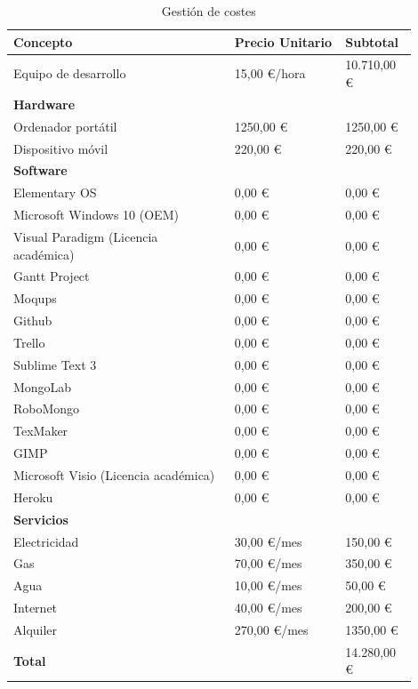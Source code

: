 	\begin{table}[H]
	  \centering 
	  \begin{tabular}{p{0.5\linewidth}p{0.25\linewidth}p{0.15\linewidth}}
	  	\multicolumn{1}{l}{\cellcolor{black!30}\textbf{Concepto}} &
	    \multicolumn{1}{l}{\cellcolor{black!30}\textbf{Precio Unitario}} & 
	 	\multicolumn{1}{l}{\cellcolor{black!30}\textbf{Subtotal}}
	 	\\	 
	    \toprule
		Equipo de desarrollo 					&	15,00 \euro /hora	&	10.710,00 \euro	\\
		
		\multicolumn{3}{l}{\cellcolor{black!30}\textbf{Hardware}}						\\			
		Ordenador portátil						&	1250,00 \euro		&	1250,00 \euro	\\
		Dispositivo móvil						&	220,00 \euro		&	220,00 \euro	\\

		\multicolumn{3}{l}{\cellcolor{black!30}\textbf{Software}}						\\
		Elementary OS							&	0,00 \euro			&	0,00 \euro	\\
		Microsoft Windows 10 (\ac{OEM})		&	0,00 \euro			&	0,00	\euro	\\
		Visual Paradigm	(Licencia académica)	&	0,00 \euro			&	0,00 \euro	\\
		Gantt Project							&	0,00 \euro			&	0,00 \euro	\\
		Moqups									&	0,00 \euro			&	0,00 \euro	\\
		Github									&	0,00 \euro			&	0,00	\euro	\\
		Trello									&	0,00 \euro			&	0,00 \euro	\\
		Sublime Text 3							&	0,00 \euro			&	0,00 \euro	\\
		MongoLab								&	0,00 \euro			&	0,00 \euro	\\
		RoboMongo								&	0,00 \euro			&	0,00 \euro	\\
		TexMaker								&	0,00 \euro			&	0,00 \euro	\\
		GIMP									&	0,00 \euro			&	0,00 \euro	\\
		Microsoft Visio	(Licencia académica)	&	0,00 \euro			&	0,00 \euro	\\
		Heroku									&	0,00 \euro			&	0,00	\euro	\\

		\multicolumn{3}{l}{\cellcolor{black!30}\textbf{Servicios}}						\\			
		Electricidad							&	30,00 \euro	/mes	&	150,00	\euro	\\
		Gas										&	70,00 \euro /mes	&	350,00 \euro	\\
		Agua									&	10,00 \euro	/mes	&	50,00 \euro	\\
		Internet								&	40,00 \euro	/mes	&	200,00 \euro	\\
		Alquiler								&	270,00 \euro /mes	&	1350,00 \euro	\\
		\textbf{Total} 							&						&	14.280,00 \euro	\\
	    \hline
	  \end{tabular}
	  \caption{Gestión de costes}
	  \label{tab:costes}
	\end{table}


